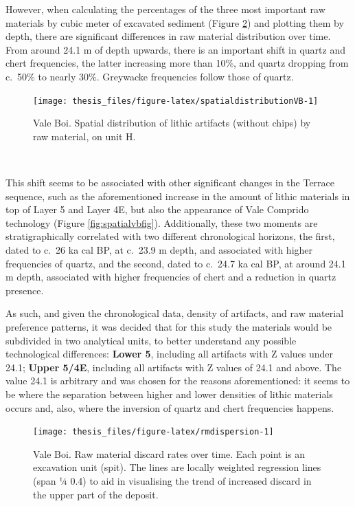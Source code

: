 \documentclass[12pt,twoside]{reedthesis}
\begin{document}
However, when calculating the percentages of the three most important raw materials by cubic meter of excavated sediment (Figure \ref{fig:rmdispersion}) and plotting them by depth, there are significant differences in raw material distribution over time. From around 24.1 m of depth upwards, there is an important shift in quartz and chert frequencies, the latter increasing more than 10\%, and quartz dropping from c.~50\% to nearly 30\%. Greywacke frequencies follow those of quartz.
\begin{figure}

{\centering \texttt{[image: thesis\_files/figure-latex/spatialdistributionVB-1]} 

}

\caption{Vale Boi. Spatial distribution of lithic artifacts (without chips) by raw material, on unit H.}\label{fig:spatialdistributionVB}
\end{figure}
~

This shift seems to be associated with other significant changes in the Terrace sequence, such as the aforementioned increase in the amount of lithic materials in top of Layer 5 and Layer 4E, but also the appearance of Vale Comprido technology (Figure \ref{fig:spatialvbfig}). Additionally, these two moments are stratigraphically correlated with two different chronological horizons, the first, dated to c.~26 ka cal BP, at c.~23.9 m depth, and associated with higher frequencies of quartz, and the second, dated to c.~24.7 ka cal BP, at around 24.1 m depth, associated with higher frequencies of chert and a reduction in quartz presence.

As such, and given the chronological data, density of artifacts, and raw material preference patterns, it was decided that for this study the materials would be subdivided in two analytical units, to better understand any possible technological differences: \textbf{Lower 5}, including all artifacts with Z values under 24.1; \textbf{Upper 5/4E}, including all artifacts with Z values of 24.1 and above. The value 24.1 is arbitrary and was chosen for the reasons aforementioned: it seems to be where the separation between higher and lower densities of lithic materials occurs and, also, where the inversion of quartz and chert frequencies happens.
\begin{figure}[H]

{\centering \texttt{[image: thesis\_files/figure-latex/rmdispersion-1]} 

}

\caption{Vale Boi. Raw material discard rates over time. Each point is an excavation unit (spit). The lines are locally weighted regression lines (span ¼ 0.4) to aid in visualising the trend of increased discard in the upper part of the deposit.}\label{fig:rmdispersion}
\end{figure}
~
\end{document}
